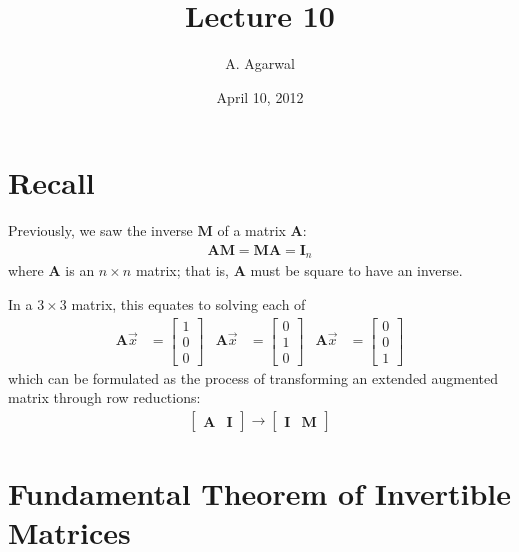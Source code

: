 \documentclass[11pt]{article}
\title{Lecture 10}
\author{A. Agarwal}
\date{April 10, 2012}
\newcommand{\mat}[1]{\mathbf{#1}}
\newcommand{\vek}[1]{\vec{#1}}
\begin{document}

\section*{Recall}

Previously, we saw the inverse $\mat{M}$ of a matrix $\mat{A}$:
\begin{align*}
\mat{A} \mat{M} = \mat{M} \mat{A} = \mat{I}_n
\end{align*}
where $\mat{A}$ is an $n \times n$ matrix; that is, $\mat{A}$ must be square to have an inverse.

In a $3 \times 3$ matrix, this equates to solving each of
\begin{align*}
\mat{A} \vek{x} &= \begin{bmatrix}1\\0\\0\end{bmatrix}
&
\mat{A} \vek{x} &= \begin{bmatrix}0\\1\\0\end{bmatrix}
&
\mat{A} \vek{x} &= \begin{bmatrix}0\\0\\1\end{bmatrix}
\end{align*}
which can be formulated as the process of transforming an extended augmented matrix through row reductions:
\begin{align*}
\left[\begin{matrix} \mat{A} & \mat{I}\end{matrix}\right]
\longrightarrow
\left[\begin{matrix} \mat{I} & \mat{M}\end{matrix}\right]
\end{align*}

\section*{Fundamental Theorem of Invertible Matrices}
\end{document}

